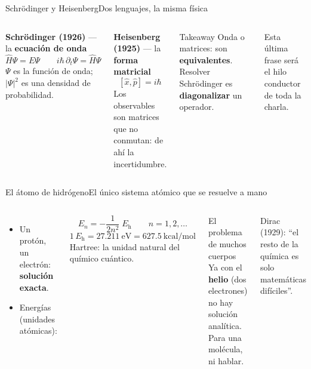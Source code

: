 \documentclass[aspectratio=169]{beamer}
\newcommand{\cplx}[1]{{\footnotesize\color{cookieMuted}#1}}
\newcommand{\Eh}{E_\mathrm{h}}
\begin{document}
\begin{frame}{Schrödinger y Heisenberg}{Dos lenguajes, la misma física}
  \begin{columns}[T,onlytextwidth]
      \textbf{Schrödinger (1926)} --- la \textbf{ecuación de onda}
      \[ \hat H\Psi = E\Psi \qquad i\hbar\,\partial_t\Psi=\hat H\Psi \]
      {\small $\Psi$ es la función de onda; $|\Psi|^2$ es una densidad de probabilidad.}
      \vspace{.8em}

      \textbf{Heisenberg (1925)} --- la \textbf{forma matricial}
      \[ [\hat x,\hat p]=i\hbar \]
      {\small Los observables son matrices que no conmutan: de ahí la incertidumbre.}
      \begin{exampleblock}{Takeaway}
        Onda o matrices: son \textbf{equivalentes}. Resolver Schrödinger es \textbf{diagonalizar} un operador.
      \end{exampleblock}
      \cplx{Esta última frase será el hilo conductor de toda la charla.}
  \end{columns}
\end{frame}

\begin{frame}{El átomo de hidrógeno}{El único sistema atómico que se resuelve a mano}
  \begin{columns}[T,onlytextwidth]
      \begin{itemize}\setlength\itemsep{5pt}
        \item Un protón, un electrón: \textbf{solución exacta}.
        \item Energías (unidades atómicas):
      \end{itemize}
      \[ E_n=-\frac{1}{2n^{2}}\;\Eh \qquad n=1,2,\dots \]
      \[ 1\,\Eh = 27.211\ \mathrm{eV} = 627.5\ \mathrm{kcal/mol} \]
      \cplx{Hartree: la unidad natural del químico cuántico.}
      \begin{alertblock}{El problema de muchos cuerpos}
        Ya con el \textbf{helio} (dos electrones) no hay solución analítica.
        Para una molécula, ni hablar.
      \end{alertblock}
      \cplx{Dirac (1929): ``el resto de la química es solo matemáticas difíciles''.}
  \end{columns}
\end{frame}
\end{document}
